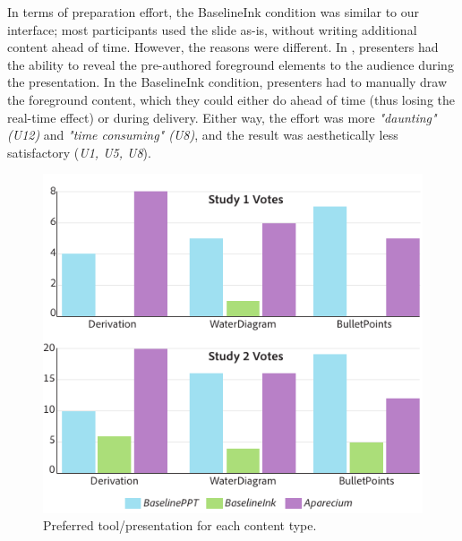%
In terms of preparation effort, the BaselineInk condition was similar to our interface; most participants used the slide as-is, without writing additional content ahead of time. However, the reasons were different. In \interface, presenters had the ability to reveal the pre-authored foreground elements to the audience during the presentation. In the BaselineInk condition, presenters had to manually draw the foreground content, which they could either do ahead of time (thus losing the real-time effect) or during delivery. Either way, the effort was more \textit{"daunting"  (U12)} and  \textit{"time consuming" (U8)}, and the result was aesthetically less satisfactory (\textit{U1, U5, U8}).  
%

\begin{figure}[t!]
    \centering
        \includegraphics[width=1\columnwidth]{figures/studyVotes}
        \caption{Preferred tool/presentation for each content type.}
\label{fig:votes}
\end{figure}

